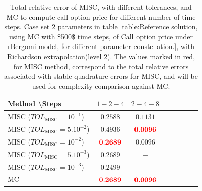 \begin{table}[!h]
	\centering
	\begin{tabular}{l*{6}{c}r}
		Method \textbackslash  Steps            & $1-2-4$ & $2-4-8$  \\
		\hline
		MISC ($TOL_{\text{MISC}}=10^{-1}$)  & $\mathbf{ 0.2588
		}$ & $\mathbf{ 0.1131}$ \\
		MISC ($TOL_{\text{MISC}}=5.10^{-2}$)  & $\mathbf{   0.4936
		}$ & $\mathbf{{\color{red} 0.0096} }$  \\
		MISC ($TOL_{\text{MISC}}=10^{-2}$)  & $\mathbf{ {\color{red}0.2689}}$ & $\mathbf{ 0.0096 }$    \\	
		MISC ($TOL_{\text{MISC}}=5.10^{-3}$)  & $\mathbf{ 0.2689}$ & $\mathbf{-}$   \\
		MISC ($TOL_{\text{MISC}}=10^{-3}$)  & $\mathbf{ 0.2499}$ & $\mathbf{-}$   \\
		\hline
		MC   & $\mathbf{{\color{red}0.2689}}$  & $\mathbf{{\color{red} 0.0096}}$    \\
		\hline
	\end{tabular}
	\caption{Total relative  error of MISC, with different tolerances, and MC to compute call option price   for different number of time steps. Case set $2$ parameters in table \ref{table:Reference solution, using MC with $500$ time steps, of Call option price under rBergomi model, for different parameter constellation.}, with Richardson extrapolation(level $2$). The values marked in red, for MISC method, correspond to the total relative errors associated with  stable quadrature errors for MISC, and will be used for complexity comparison against MC.}
	\label{Total  error of MISC and MC to compute Call option price of the different tolerances for different number of time steps. Case set $2$ parameters, with Richardson extrapolation(level $2$). The numbers between parentheses are the corresponding absolute errors,linear}
\end{table}

